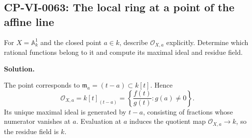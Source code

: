 
\subsection*{CP-VI-0063: The local ring at a point of the affine line}

For $X=\mathbb A_k^1$ and the closed point $a\in k$, describe $\mathcal O_{X,a}$ explicitly. Determine which rational functions belong to it and compute its maximal ideal and residue field.

\medskip
\noindent\textbf{Solution.}

The point corresponds to $\mathfrak m_a=(t-a)\subset k[t]$. Hence
\[
\mathcal O_{X,a}=k[t]_{(t-a)}
=\left\{\frac{f(t)}{g(t)}:g(a)\ne0\right\}.
\]
Its unique maximal ideal is generated by $t-a$, consisting of fractions whose numerator vanishes at $a$. Evaluation at $a$ induces the quotient map $\mathcal O_{X,a}\to k$, so the residue field is $k$.
